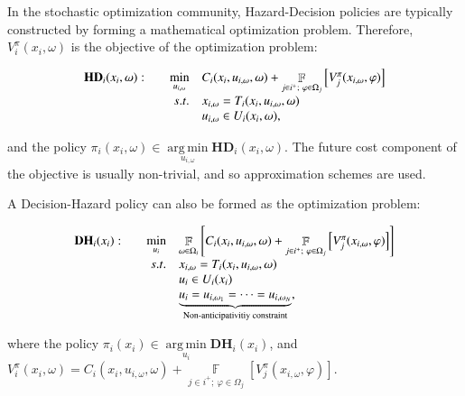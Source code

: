 \documentclass[final,1p,times]{elsarticle}
\DeclareMathOperator*{\F}{\mathbb{F}}
\DeclareMathOperator*{\argmin}{arg\,min}
\begin{document}
In the stochastic optimization community, Hazard-Decision policies are typically constructed by forming a mathematical optimization problem. Therefore, $V^\pi_i(x_i, \omega)$ is the objective of the optimization problem:

\begin{equation}
\begin{array}{l r l}

    \textbf{HD}_i(x_i, \omega):\quad & \min\limits_{u_{i,\omega}}& C_i(x_i, u_{i,\omega}, \omega) + \F\limits_{j\in i^{+};\ \varphi\in\Omega_j} \left[V^\pi_j(x_{i,\omega}, \varphi)\right] \\
   &{s.t.} & x_{i,\omega} = T_i(x_i, u_{i,\omega}, \omega)\\
   &       & u_{i,\omega} \in U_i(x_i, \omega),
\end{array}
\label{eq:stageproblem}
\end{equation}

and the policy $\pi_i(x_i, \omega) \in \argmin\limits_{u_{i,\omega}} \textbf{HD}_i(x_i, \omega)$. The future cost component of the objective is usually non-trivial, and so approximation schemes are used.

A Decision-Hazard policy can also be formed as the optimization problem:

\begin{equation}
\begin{array}{l r l}
    \textbf{DH}_i(x_i):\quad & \min\limits_{u_i}& \F\limits_{\omega\in\Omega_i}\left[C_i(x_i, u_{i,\omega}, \omega) + \F\limits_{j\in i^{+};\ \varphi\in\Omega_j} \left[V^\pi_j(x_{i,\omega}, \varphi)\right]\right] \\
   &{s.t.} & x_{i,\omega} = T_i(x_i, u_{i,\omega}, \omega)\\
   &       & u_{i} \in U_i(x_i)\\
   &       & \underbrace{u_{i} = u_{i,\omega_1} = \dots = u_{i,\omega_N}}_{\text{Non-anticipativitiy constraint}},
\end{array}
\label{eq:detequiv}
\end{equation}

where the policy $\pi_i(x_i) \in \argmin\limits_{u_{i}} \textbf{DH}_i(x_i)$, and $V^\pi_i(x_i, \omega) = C_i(x_i, u_{i,\omega}, \omega) + \F\limits_{j\in i^{+};\ \varphi\in\Omega_j} \left[V^\pi_j(x_{i,\omega}, \varphi)\right]$. 
\end{document}
